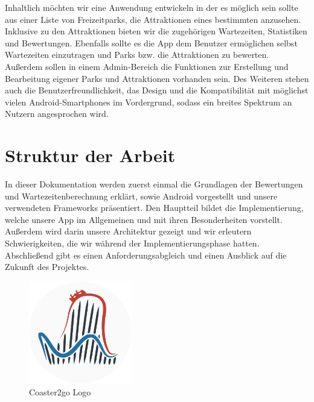 Inhaltlich möchten wir eine Anwendung entwickeln in der es möglich sein sollte aus einer Liste von Freizeitparks, die Attraktionen eines bestimmten anzusehen. Inklusive zu den Attraktionen bieten wir die zugehörigen Wartezeiten, Statistiken und Bewertungen. 
Ebenfalls sollte es die App dem Benutzer ermöglichen selbst Wartezeiten einzutragen und Parks bzw. die Attraktionen zu bewerten.
Außerdem sollen in einem Admin-Bereich die Funktionen zur Erstellung und Bearbeitung eigener Parks und Attraktionen vorhanden sein.
Des Weiteren stehen auch die Benutzerfreundlichkeit, das Design und die Kompatibilität mit möglichst vielen Android-Smartphones im Vordergrund, sodass ein breites Spektrum an Nutzern angesprochen wird. 

\section{Struktur der Arbeit}
\label{sec:einleitung:struktur}

In dieser Dokumentation werden zuerst einmal die Grundlagen der Bewertungen und Wartezeitenberechnung erklärt, sowie Android vorgestellt und unsere verwendeten Frameworks präsentiert. Den Hauptteil bildet die Implementierung, welche unsere App im Allgemeinen und mit ihren Besonderheiten vorstellt. Außerdem wird darin unsere Architektur gezeigt und wir erleutern Schwierigkeiten, die wir während der Implementierungsphase hatten. Abschließend gibt es einen Anforderungsabgleich und einen Ausblick auf die Zukunft des Projektes.\\

\begin{figure}[htp]
	\centering
  	\includegraphics[width=0.4\textwidth]{img/coaster42_logo.png}
	\caption{Coaster2go Logo}
	\label{figure:coaster2gologo}
\end{figure}
